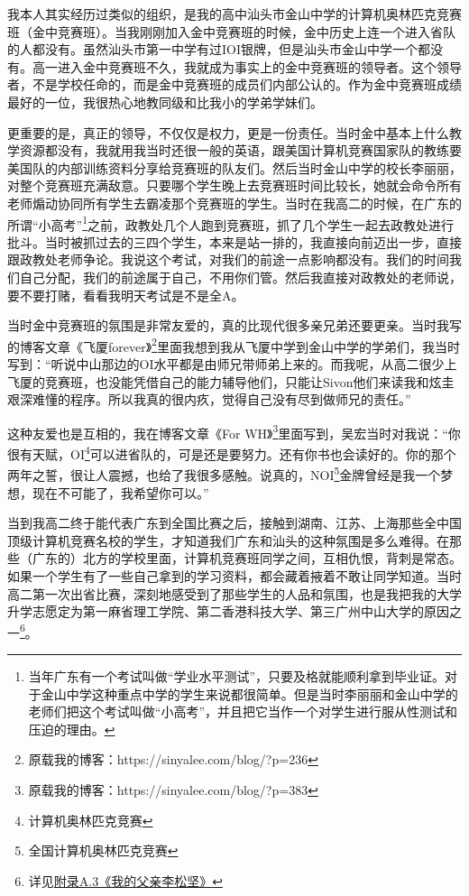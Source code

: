 我本人其实经历过类似的组织，是我的高中汕头市金山中学的计算机奥林匹克竞赛班（金中竞赛班）。当我刚刚加入金中竞赛班的时候，金中历史上连一个进入省队的人都没有。虽然汕头市第一中学有过IOI银牌，但是汕头市金山中学一个都没有。高一进入金中竞赛班不久，我就成为事实上的金中竞赛班的领导者。这个领导者，不是学校任命的，而是金中竞赛班的成员们内部公认的。作为金中竞赛班成绩最好的一位，我很热心地教同级和比我小的学弟学妹们。

更重要的是，真正的领导，不仅仅是权力，更是一份责任。当时金中基本上什么教学资源都没有，我就用我当时还很一般的英语，跟美国计算机竞赛国家队的教练要美国队的内部训练资料分享给竞赛班的队友们。然后当时金山中学的校长李丽丽，对整个竞赛班充满敌意。只要哪个学生晚上去竞赛班时间比较长，她就会命令所有老师煽动协同所有学生去霸凌那个竞赛班的学生。当时在我高二的时候，在广东的所谓``小高考''\footnote{当年广东有一个考试叫做``学业水平测试''，只要及格就能顺利拿到毕业证。对于金山中学这种重点中学的学生来说都很简单。但是当时李丽丽和金山中学的老师们把这个考试叫做``小高考''，并且把它当作一个对学生进行服从性测试和压迫的理由。}之前，政教处几个人跑到竞赛班，抓了几个学生一起去政教处进行批斗。当时被抓过去的三四个学生，本来是站一排的，我直接向前迈出一步，直接跟政教处老师争论。我说这个考试，对我们的前途一点影响都没有。我们的时间我们自己分配，我们的前途属于自己，不用你们管。然后我直接对政教处的老师说，要不要打赌，看看我明天考试是不是全A。

当时金中竞赛班的氛围是非常友爱的，真的比现代很多亲兄弟还要更亲。当时我写的博客文章《飞厦forever》\footnote{原载我的博客：https://sinyalee.com/blog/?p=236}里面我想到我从飞厦中学到金山中学的学弟们，我当时写到：``听说中山那边的OI水平都是由师兄带师弟上来的。而我呢，从高二很少上飞厦的竞赛班，也没能凭借自己的能力辅导他们，只能让Sivon他们来读我和炫圭艰深难懂的程序。所以我真的很内疚，觉得自己没有尽到做师兄的责任。''

这种友爱也是互相的，我在博客文章《For WH》\footnote{原载我的博客：https://sinyalee.com/blog/?p=383}里面写到，吴宏当时对我说：``你很有天赋，OI\footnote{计算机奥林匹克竞赛}可以进省队的，可是还是要努力。还有你书也会读好的。你的那个两年之誓，很让人震撼，也给了我很多感触。说真的，NOI\footnote{全国计算机奥林匹克竞赛}金牌曾经是我一个梦想，现在不可能了，我希望你可以。''

当到我高二终于能代表广东到全国比赛之后，接触到湖南、江苏、上海那些全中国顶级计算机竞赛名校的学生，才知道我们广东和汕头的这种氛围是多么难得。在那些（广东的）北方的学校里面，计算机竞赛班同学之间，互相仇恨，背刺是常态。如果一个学生有了一些自己拿到的学习资料，都会藏着掖着不敢让同学知道。当时高二第一次出省比赛，深刻地感受到了那些学生的人品和氛围，也是我把我的大学升学志愿定为第一麻省理工学院、第二香港科技大学、第三广州中山大学的原因之一\footnote{详见\hyperref[3faces]{附录A.3《我的父亲李松坚》}}。

